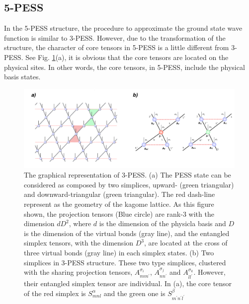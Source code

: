 \subsection{5-PESS}
In the 5-PESS structure, the procedure to approximate the ground state wave function is similar to 3-PESS. However, due to the transformation of the structure, the character of core tensors in 5-PESS is a little different from 3-PESS. See Fig. \ref{fig4323}(a), it is obvious that the core tensors are located on the physical sites. In other words, the core tensors, in 5-PESS, include the physical basis states.

\label{5pess}
\begin{figure}[ht]
	\centering
	\includegraphics[width=1.00\textwidth]{figures/fig4323.png}
	\caption[The graphical representation of 3-PESS]{The graphical representation of 3-PESS. (a) The PESS state can be considered as composed by two simplices, upward- (green triangular) and downward-triangular (green triangular). The red dash-line represent as the geometry of the kagome lattice. As this figure shown, the projection tensors (Blue circle) are rank-3 with the dimension $dD^2$, where $d$ is the dimension of the physicla basis and $D$ is the dimension of the virtual bonds (gray line), and the entangled simplex tensors, with the dimension $D^3$, are located at the cross of three virtual bonds (gray line) in each simplex states. (b) Two simplices in 3-PESS structure. These two type simplices, clustered with the sharing projection tensors, $A^{\sigma_i}_{mm^{\prime}}$, $A^{\sigma_j}_{nn^{\prime}}$ and $A^{\sigma_k}_{ll^{\prime}}$. However, their entangled simplex tensor are individual. In (a), the core tensor of the red simplex is $S^{\alpha}_{mnl}$ and the green one is $S^{\beta}_{m^{\prime}n^{\prime}l^{\prime}}$}
	\label{fig4323}
\end{figure}
